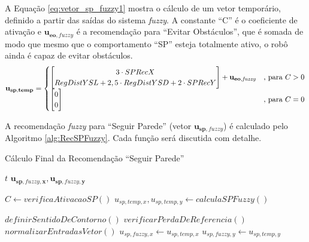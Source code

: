 	A Equação \ref{eq:vetor_sp_fuzzy1} mostra o cálculo de um vetor temporário, definido a 
	partir das saídas do sistema \textit{fuzzy}. A constante ``C'' é o coeficiente de ativação
	e $\mathbf{u_{eo,\mathit{fuzzy}}}$ é a recomendação para ``Evitar Obstáculos'', que é somada
	de modo que mesmo que o comportamento ``SP'' esteja totalmente ativo, o robô ainda é capaz
	de evitar obstáculos. 
	\begin{equation}
		\label{eq:vetor_sp_fuzzy1}
			\mathbf{u_{sp,temp}} =
			\begin{cases}
			 
			\mleft[
			\begin{matrix}
		  		3 \cdot SPRecX \\
		  		RegDistYSL + 2,5 \cdot RegDistYSD + 2 \cdot SPRecY \\
			\end{matrix}
			\mright] + \mathbf{u_{eo,\mathit{fuzzy}}} & \text{, para} \ C > 0 \\
			
			\mleft[
			\begin{matrix}
		  		0 \\
		  		0 \\
			\end{matrix}
			\mright]  & \text{, para} \ C = 0 \\
			
			\end{cases}
	\end{equation}

	A recomendação \textit{fuzzy} para ``Seguir Parede'' (vetor $\mathbf{u_{sp,\mathit{fuzzy}}}$)
	é calculado pelo Algoritmo \ref{alg:RecSPFuzzy}. Cada função será discutida com detalhe. 
	\begin{algorithm}
		\caption{Cálculo Final da Recomendação ``Seguir Parede''}
		\label{alg:RecSPFuzzy}%
		\begin{algorithmic}[1]
	
		\REQUIRE $t$
		\ENSURE $\mathbf{u_{sp,\mathit{fuzzy}, x}}, \mathbf{u_{sp,\mathit{fuzzy}, y}}$
		
		\STATE $C \leftarrow verificaAtivacaoSP()$
		\STATE $u_{sp,temp,x}, u_{sp,temp,y} \leftarrow calculaSPFuzzy()$
		
			\STATE $definirSentidoDeContorno()$
			\STATE $verificarPerdaDeReferencia()$
			\STATE $normalizarEntradasVetor()$
		\ELSE
			\STATE $u_{sp,\mathit{fuzzy}, x} \leftarrow u_{sp,temp,x}$
			\STATE $u_{sp,\mathit{fuzzy}, y} \leftarrow u_{sp,temp,y}$
		\ENDIF
	
		\end{algorithmic}
	\end{algorithm}
	
